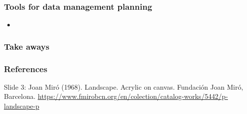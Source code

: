 \documentclass{beamer}
\begin{document}
\begin{frame}
  \frametitle{Tools for data management planning}
  
  \begin{itemize}
  \item 
  \end{itemize}
\end{frame}

\begin{frame}
  \frametitle{Take aways}
  
\end{frame}

\begin{frame}
  \frametitle{References}
  \tiny
  
  
  Slide 3: Joan Mir{\'o} (1968). Landscape. Acrylic on canvas. Fundaci{\'o}n Joan Mir{\'o}, Barcelona. \url{https://www.fmirobcn.org/en/colection/catalog-works/5442/p-landscape-p}
\end{frame}
\end{document}
